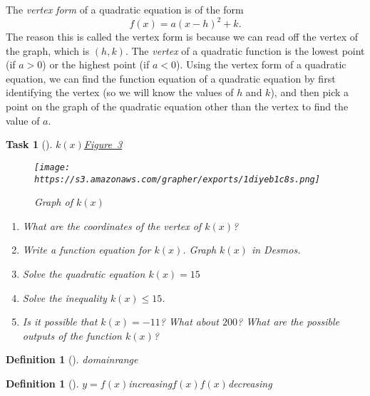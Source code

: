 \documentclass[10pt,]{article}
\theoremstyle{plain}
\newtheorem{proposition}[theorem]{Task}
\theoremstyle{definition}
\newtheorem{definition}[theorem]{Definition}
\numberwithin{equation}{section}
\newcommand{\lt}{<}
\newcommand{\gt}{>}
\begin{document}
\hypertarget{p-52}{}%
The \emph{vertex form} of a quadratic equation is of the form%
\begin{equation*}
f(x)=a(x-h)^2+k\text{.}
\end{equation*}
The reason this is called the vertex form is because we can read off the vertex of the graph, which is \((h,k)\). The \emph{vertex} of a quadratic function is the lowest point (if \(a \gt 0\)) or the highest point (if \(a \lt 0\)). Using the vertex form of a quadratic equation, we can find the function equation of a quadratic equation by first identifying the vertex (so we will know the values of \(h\) and \(k\)), and then pick a point on the graph of the quadratic equation other than the vertex to find the value of \(a\).%
\begin{proposition}[{}]\label{proposition-7}
\(k(x)\)\hyperref[quadratic-findformula]{Figure~3}\begin{figure}
\centering
\texttt{[image: https://s3.amazonaws.com/grapher/exports/1diyeb1c8s.png]}
\caption{Graph of \(k(x)\)\label{quadratic-findformula}}
\end{figure}
\leavevmode%
\begin{enumerate}
\item\hypertarget{li-73}{}What are the coordinates of the vertex of \(k(x)\)?%
\item\hypertarget{li-74}{}Write a function equation for \(k(x)\). Graph \(k(x)\) in Desmos.%
\item\hypertarget{li-75}{}Solve the quadratic equation \(k(x)=15\)%
\item\hypertarget{li-76}{}Solve the inequality \(k(x) \leq 15\).%
\item\hypertarget{li-77}{}Is it possible that \(k(x) = -11\)? What about \(200\)? What are the possible outputs of the function \(k(x)\)?%
\end{enumerate}
\end{proposition}
\begin{definition}[{}]\label{definition-1}
\emph{domain}\emph{range}\end{definition}
\begin{definition}[{}]\label{definition-2}
\(y=f(x)\)\emph{increasing}\(f(x)\)\(f(x)\)\emph{decreasing}\end{definition}
\end{document}

